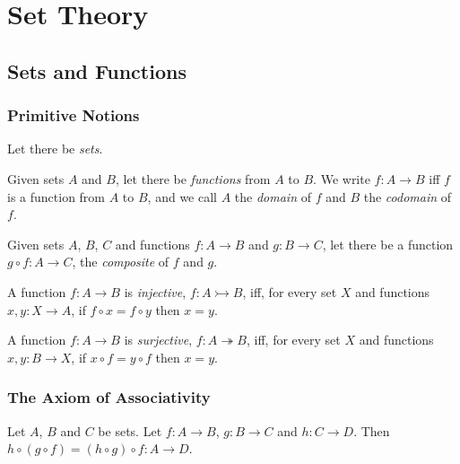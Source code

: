 \newcommand{\ran}{\ensuremath{\operatorname{ran}}}

\chapter{Set Theory}

\section{Sets and Functions}

\subsection{Primitive Notions}

Let there be \emph{sets}.

Given sets $A$ and $B$, let there be \emph{functions} from $A$ to $B$. We
write $f : A \rightarrow B$ iff $f$ is a function from $A$ to $B$, and we call $A$ the \emph{domain} of $f$ and $B$ the \emph{codomain} of $f$.

Given sets $A$, $B$, $C$ and functions $f : A \rightarrow B$ and $g : B \rightarrow C$, let there be
a function $g \circ f : A \rightarrow C$, the \emph{composite} of $f$ and $g$.

\begin{df}[Injective]
  A function $f : A \rightarrow B$ is \emph{injective}, $f : A \rightarrowtail B$, iff, for every set $X$ and functions $x, y : X \rightarrow A$, if $f \circ x = f \circ y$ then $x = y$.
\end{df}

\begin{df}[Surjective]
  A function $f : A \rightarrow B$ is \emph{surjective}, $f : A \twoheadrightarrow B$, iff, for every set $X$ and functions $x, y : B \rightarrow X$, if $x \circ f = y \circ f$ then $x = y$.
\end{df}

\subsection{The Axiom of Associativity}

\begin{ax}
  Let $A$, $B$ and $C$ be sets.
  Let $f : A \rightarrow B$, $g : B \rightarrow C$ and $h : C \rightarrow D$.
  Then $h \circ (g \circ f) = (h \circ g) \circ f : A \rightarrow D$.
\end{ax}

